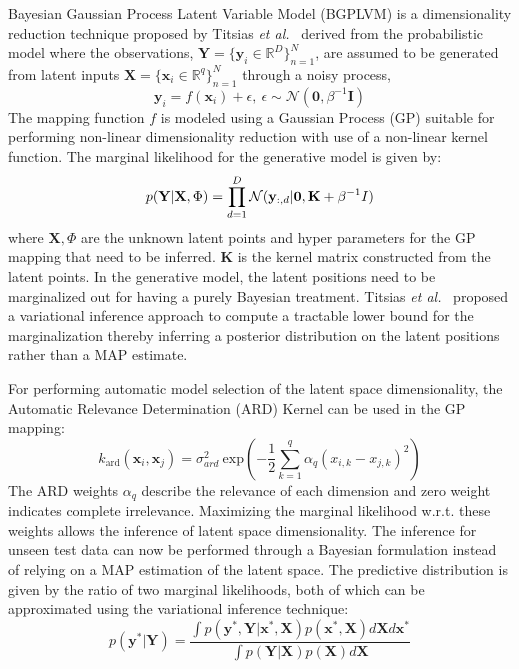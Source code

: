 \documentclass{article}
\begin{document}
Bayesian Gaussian Process Latent Variable Model (BGPLVM) is a dimensionality reduction technique proposed by Titsias \emph{et al.}~\cite{bgplvm}  derived from the probabilistic model where the observations, $\mathbf{Y} = \{\mathbf{y}_{i} \in \mathbb{R}^D\}_{n=1}^N$, are assumed to be generated from latent inputs $\mathbf{X} = \{\mathbf{x}_{i} \in \mathbb{R}^q\}_{n=1}^N$ through a noisy process,
\begin{equation}
  \mathbf{y}_i = f(\mathbf{x}_i) + \epsilon,~\epsilon \sim \mathcal{N}(\mathbf{0},\beta^{-1}\mathbf{I})
\end{equation}
The mapping function $f$ is modeled using a Gaussian Process (GP) suitable for performing non-linear dimensionality reduction with use of a non-linear kernel function. The marginal likelihood for the generative model is given by:
\begin{equation}
  \label{eqn:marginallikelihood}
  p(\mathbf{Y}|\mathbf{X},\Phi) = \prod_{d=1}^{D} \mathcal{N}(\mathbf{y}_{:,d}|\mathbf{0},\mathbf{K}+\beta^{-1}I)\\
\end{equation}
where $\mathbf{X},\Phi$ are the unknown latent points and hyper parameters for the GP mapping that need to be inferred. $\mathbf{K}$ is the kernel matrix constructed from the latent points. In the generative model, the latent positions need to be marginalized out for having a purely Bayesian treatment. Titsias \emph{et al.}~\cite{bgplvm} proposed a variational inference approach to compute a tractable lower bound for the marginalization thereby inferring a posterior distribution on the latent positions rather than a MAP estimate.

For performing automatic model selection of the latent space dimensionality, the Automatic Relevance Determination (ARD) Kernel can be used in the GP mapping:
\begin{equation}
  \label{eqn:ardkernel}
  k_{\text{ard}}(\mathbf{x}_i,\mathbf{x}_j) = \sigma_{ard}^2~\text{exp}\left( - \frac{1}{2} \sum_{k=1}^q{\alpha_q (x_{i,k} - x_{j,k})^2}\right)
\end{equation}
The ARD weights $\alpha_q$ describe the relevance of each dimension and zero weight indicates complete irrelevance. Maximizing the marginal likelihood w.r.t. these weights allows the inference of latent space dimensionality. The inference for unseen test data can now be performed through a Bayesian formulation instead of relying on a MAP estimation of the latent space. The predictive distribution is given by the ratio of two marginal likelihoods, both of which can be approximated using the variational inference technique:
\begin{equation}
	\label{eqn:testinference}
	p(\mathbf{y}^*|\mathbf{Y}) = \frac{\int p(\mathbf{y}^*,\mathbf{Y}|\mathbf{x}^*,\mathbf{X})p(\mathbf{x}^*,\mathbf{X})d\mathbf{X}d\mathbf{x}^*}{\int p(\mathbf{Y}|\mathbf{X})p(\mathbf{X})d\mathbf{X}}
\end{equation}
\end{document}
